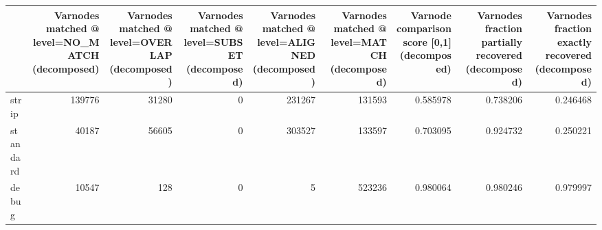 \begin{tabular}{lrrrrrrrr}
\toprule
{} &  Varnodes matched @ level=NO\_MATCH (decomposed) &  Varnodes matched @ level=OVERLAP (decomposed) &  Varnodes matched @ level=SUBSET (decomposed) &  Varnodes matched @ level=ALIGNED (decomposed) &  Varnodes matched @ level=MATCH (decomposed) &  Varnode comparison score [0,1] (decomposed) &  Varnodes fraction partially recovered (decomposed) &  Varnodes fraction exactly recovered (decomposed) \\
\midrule
strip    &                                          139776 &                                          31280 &                                             0 &                                         231267 &                                       131593 &                                     0.585978 &                                           0.738206 &                                          0.246468 \\
standard &                                           40187 &                                          56605 &                                             0 &                                         303527 &                                       133597 &                                     0.703095 &                                           0.924732 &                                          0.250221 \\
debug    &                                           10547 &                                            128 &                                             0 &                                              5 &                                       523236 &                                     0.980064 &                                           0.980246 &                                          0.979997 \\
\bottomrule
\end{tabular}

